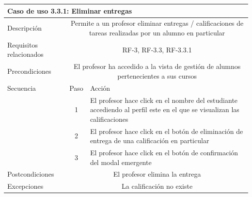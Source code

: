 \hspace{3cm}


\begin{tabular}[H]{l c l}
\toprule 
\multicolumn{3}{l}{\textbf{Caso de uso 3.3.1: Eliminar entregas}}\\
\midrule
Descripción & \multicolumn{2}{p{10cm}}{Permite a un profesor eliminar entregas / calificaciones de tareas realizadas por un alumno en particular}\\
\midrule
Requisitos relacionados & \multicolumn{2}{p{10cm}}{RF-3, RF-3.3, RF-3.3.1}\\
\midrule
Precondiciones & \multicolumn{2}{p{10cm}}{El profesor ha accedido a la vista de gestión de alumnos pertenecientes a sus cursos}\\
\midrule
Secuencia & Paso & Acción \\
\cmidrule{2-3}
         & 1 &  \multicolumn{1}{p{8cm}}{El profesor hace click en el nombre del estudiante accediendo al perfil este en el que se visualizan las calificaciones}\\
         & 2 &  \multicolumn{1}{p{8cm}}{El profesor hace click en el botón de eliminación de entrega de una calificación en particular}\\
         & 3 &  \multicolumn{1}{p{8cm}}{El profesor hace click en el botón de confirmación del modal emergente}\\
\midrule
Postcondiciones & \multicolumn{2}{p{10cm}}{El profesor elimina la entrega}\\
\midrule
Excepciones & \multicolumn{2}{p{10cm}}{La calificación no existe}\\
\bottomrule 
\end{tabular}

\hspace{3cm}

